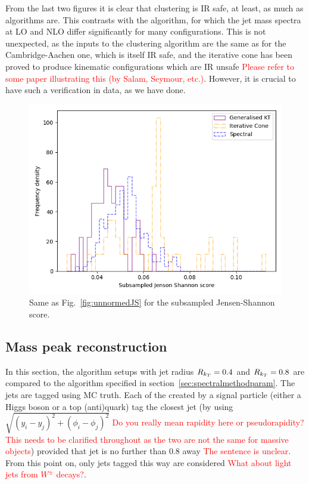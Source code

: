 From  the last two figures it is clear that \spectral{} clustering  is IR safe, at least, as much as \genkt{} algorithms are.
This contrasts with the \itercone{} algorithm, for which the jet mass spectra at LO and NLO 
differ significantly for many configurations.
This is not unexpected, as the inputs to the \spectral{} clustering algorithm 
are the same as for the Cambridge-Aachen one, 
which is itself IR safe, and the iterative cone has been  proved to produce kinematic configurations which are IR unsafe \cite{} {\textcolor{red}{Please refer to some paper illustrating this (by Salam, Seymour, etc.)}}.
However, it is crucial to have such a verification in data, as we have done.

\begin{figure}[htp]
    \begin{minipage}[c]{0.6\textwidth}
    \includegraphics[width=1.\textwidth]{graphics/JensenShannon.png}
    \end{minipage}\hfill
    \begin{minipage}[c]{0.35\textwidth}
    \caption{Same as Fig.~\ref{fig:unnormedJS} for the subsampled Jensen-Shannon score.
    }\label{fig:JensenShannon}
    \end{minipage}
\end{figure}    

\subsection{Mass peak reconstruction}
In this section, the \antikt{} algorithm setups with jet radius \(R_{k_T}{} = 0.4\) and \(R_{k_T}{} = 0.8\)
are compared to the \spectral{} algorithm specified in section~\ref{sec:spectralmethodparam}. The jets are tagged using MC truth.
Each of the  created by a signal particle (either a Higgs boson or a top (anti)quark)
tag the closest jet (by using \(\sqrt{(y_i - y_j)^2 + (\phi_i - \phi_j)^2}\) {\textcolor{red}{Do you really mean rapidity here or pseudorapidity? This needs to be clarified throughout as the two are not the same for massive objects}}) provided that jet is no further than \(0.8\) away {\textcolor{red}{The sentence is unclear}}.
From this point on, only jets tagged this way are considered {\textcolor{red}{What about light jets from $W^\pm$ decays?}}.


